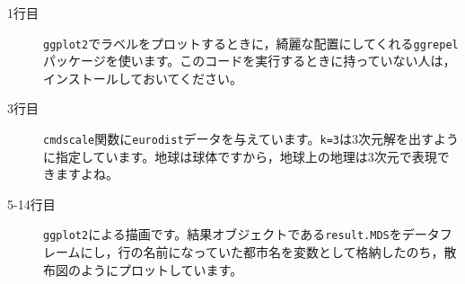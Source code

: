 \begin{description}
	\item[1行目] \verb|ggplot2|でラベルをプロットするときに，綺麗な配置にしてくれる\verb|ggrepel|パッケージを使います。このコードを実行するときに持っていない人は，インストールしておいてください。
	\item[3行目] \verb|cmdscale|関数に\verb|eurodist|データを与えています。\verb|k=3|は3次元解を出すように指定しています。地球は球体ですから，地球上の地理は3次元で表現できますよね。
	\item[5-14行目] \verb|ggplot2|による描画です。結果オブジェクトである\verb|result.MDS|をデータフレームにし，行の名前になっていた都市名を変数として格納したのち，散布図のようにプロットしています。
\end{description}
